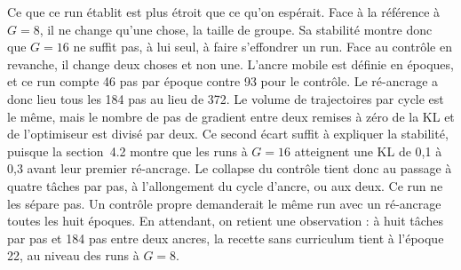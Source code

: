 \documentclass[11pt,a4paper]{article}
\begin{document}
Ce que ce run établit est plus étroit que ce qu'on espérait. Face à la référence à $G=8$, il ne change qu'une chose, la taille de groupe. Sa stabilité montre donc que $G=16$ ne suffit pas, à lui seul, à faire s'effondrer un run. Face au contrôle en revanche, il change deux choses et non une. L'ancre mobile est définie en époques, et ce run compte 46 pas par époque contre 93 pour le contrôle. Le ré-ancrage a donc lieu tous les 184 pas au lieu de 372. Le volume de trajectoires par cycle est le même, mais le nombre de pas de gradient entre deux remises à zéro de la KL et de l'optimiseur est divisé par deux. Ce second écart suffit à expliquer la stabilité, puisque la section~4.2 montre que les runs à $G=16$ atteignent une KL de 0{,}1 à 0{,}3 avant leur premier ré-ancrage. Le collapse du contrôle tient donc au passage à quatre tâches par pas, à l'allongement du cycle d'ancre, ou aux deux. Ce run ne les sépare pas. Un contrôle propre demanderait le même run avec un ré-ancrage toutes les huit époques. En attendant, on retient une observation : à huit tâches par pas et 184 pas entre deux ancres, la recette sans curriculum tient à l'époque 22, au niveau des runs à $G=8$.
\end{document}
